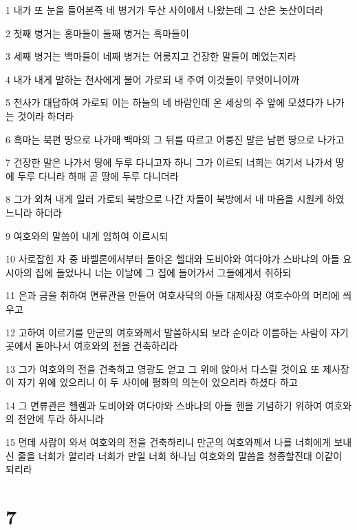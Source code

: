 \par 1 내가 또 눈을 들어본즉 네 병거가 두산 사이에서 나왔는데 그 산은 놋산이더라
\par 2 첫째 병거는 홍마들이 둘째 병거는 흑마들이
\par 3 세째 병거는 백마들이 네째 병거는 어룽지고 건장한 말들이 메었는지라
\par 4 내가 내게 말하는 천사에게 물어 가로되 내 주여 이것들이 무엇이니이까
\par 5 천사가 대답하여 가로되 이는 하늘의 네 바람인데 온 세상의 주 앞에 모셨다가 나가는 것이라 하더라
\par 6 흑마는 북편 땅으로 나가매 백마의 그 뒤를 따르고 어룽진 말은 남편 땅으로 나가고
\par 7 건장한 말은 나가서 땅에 두루 다니고자 하니 그가 이르되 너희는 여기서 나가서 땅에 두루 다니라 하매 곧 땅에 두루 다니더라
\par 8 그가 외쳐 내게 일러 가로되 북방으로 나간 자들이 북방에서 내 마음을 시원케 하였느니라 하더라
\par 9 여호와의 말씀이 내게 임하여 이르시되
\par 10 사로잡힌 자 중 바벨론에서부터 돌아온 헬대와 도비야와 여다야가 스바냐의 아들 요시아의 집에 들었나니 너는 이날에 그 집에 들어가서 그들에게서 취하되
\par 11 은과 금을 취하여 면류관을 만들어 여호사닥의 아들 대제사장 여호수아의 머리에 씌우고
\par 12 고하여 이르기를 만군의 여호와께서 말씀하시되 보라 순이라 이름하는 사람이 자기 곳에서 돋아나서 여호와의 전을 건축하리라
\par 13 그가 여호와의 전을 건축하고 영광도 얻고 그 위에 앉아서 다스릴 것이요 또 제사장이 자기 위에 있으리니 이 두 사이에 평화의 의논이 있으리라 하셨다 하고
\par 14 그 면류관은 헬렘과 도비야와 여다야와 스바냐의 아들 헨을 기념하기 위하여 여호와의 전안에 두라 하시니라
\par 15 먼데 사람이 와서 여호와의 전을 건축하리니 만군의 여호와께서 나를 너희에게 보내신 줄을 너희가 알리라 너희가 만일 너희 하나님 여호와의 말씀을 청종할진대 이같이 되리라

\chapter{7}

